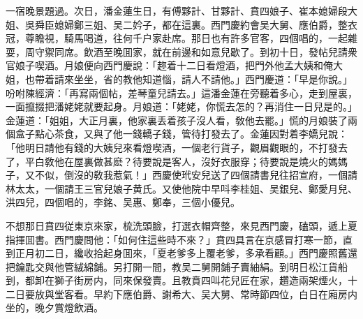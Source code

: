 一宿晚景題過。次日，潘金蓮生日，有傅夥計、甘夥計、賁四娘子、崔本媳婦段大姐、吳舜臣媳婦鄭三姐、吴二妗子，都在這裏。西門慶約會吴大舅、應伯爵，整衣冠，尊瞻視，騎馬喝道，往何千户家赴席。那日也有許多官客，四個唱的，一起雜耍，周守禦同席。飲酒至晚囬家，就在前邊和如意兒歇了。到初十日，發帖兒請衆官娘子喫酒。月娘便向西門慶說：「趂着十二日看燈酒，把門外他孟大姨和俺大姐，也帶着請來坐坐，省的教他知道惱，請人不請他。」西門慶道：「早是你說。」吩咐陳經濟：「再寫兩個帖，差琴童兒請去。」這潘金蓮在旁聽着多心，走到屋裏，一面攛掇把潘姥姥就要起身。月娘道：「姥姥，你慌去怎的？再消住一日兒是的。」金蓮道：「姐姐，大正月裏，他家裏丢着孩子沒人看，敎他去罷。」慌的月娘裝了兩個盒子點心茶食，又與了他一錢轎子錢，管待打發去了。金蓮因對着李嬌兒說：「他明日請他有錢的大姨兒來看燈喫酒，一個老行貨子，觀眉觀眼的，不打發去了，平白敎他在屋裏做甚麽？待要說是客人，沒好衣服穿；待要說是燒火的媽媽子，又不似，倒沒的敎我惹氣！」西慶使玳安兒送了四個請書兒往招宣府，一個請林太太，一個請王三官兒娘子黄氏。又使他院中早呌李桂姐、吴銀兒、鄭愛月兒、洪四兒，四個唱的，李銘、吴惠、鄭奉，三個小優兒。

不想那日賁四従東京來家，梳洗頭臉，打選衣帽齊整，來見西門慶，磕頭，遞上夏指揮囬書。西門慶問他：「如何住這些時不來？」賁四具言在京感冒打寒一節，直到正月初二日，纔收拾起身囬來，「夏老爹多上覆老爹，多承看顧。」西門慶照舊還把鑰匙交與他管絨綿鋪。另打開一間，教吴二舅開鋪子賣紬絹。到明日松江貨船到，都卸在獅子街房内，同來保發賣。且教賁四叫花兒匠在家，趲造兩架煙火，十二日要放與堂客看。早約下應伯爵、謝希大、吴大舅、常時節四位，白日在廂房内坐的，晚夕賞燈飲酒。

